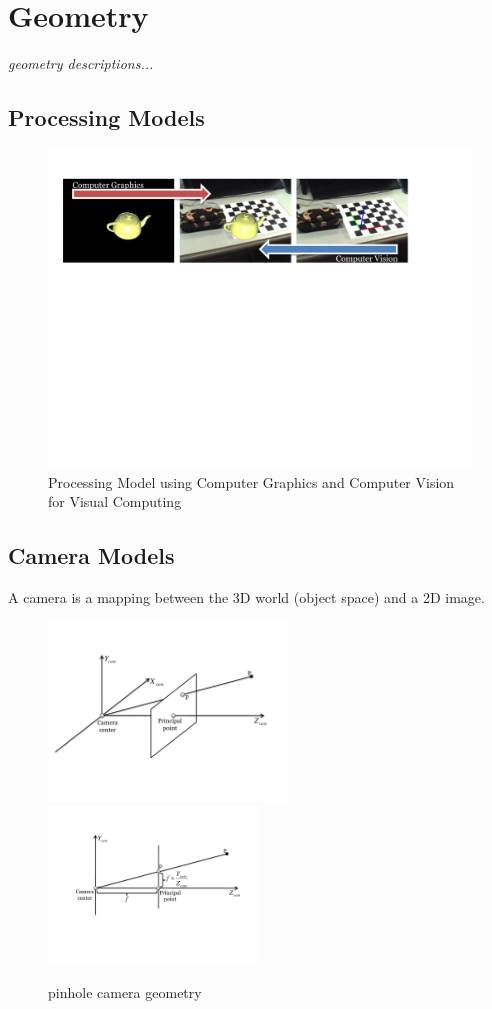 \chapter{Geometry}\label{ch:geometry}
\begin{center}
{\small\em geometry descriptions...}
\end{center}

\section{Processing Models}
\begin{figure}[!h]
\centering
\includegraphics[width=6in]{images/processingmodel.pdf}
\caption{Processing Model using Computer Graphics and Computer Vision for Visual Computing}
\label{fig:processingmodel}
\end{figure}

\section{Camera Models}
A camera is a mapping between the 3D world (object space) and a 2D image\cite{CV_book_multiple_2000_Hartley}.

\begin{figure}[!h]
\centering
\includegraphics[width=2.5in]{images/cameramodel1.pdf}
\includegraphics[width=2.2in]{images/cameramodel2.pdf}
\caption{pinhole camera geometry}
\label{fig:cameramodel}
\end{figure}